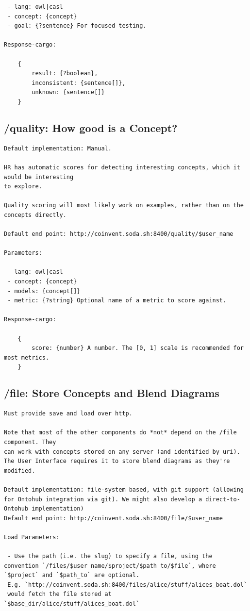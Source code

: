 \documentclass[10pt]{article}
\begin{document}
\begin{appendices}
\begin{verbatim}
 - lang: owl|casl
 - concept: {concept} 
 - goal: {?sentence} For focused testing.

Response-cargo: 
	
	{
		result: {?boolean},
		inconsistent: {sentence[]},
		unknown: {sentence[]}
	}

\end{verbatim}
\subsection{/quality: How good is a Concept?}
\begin{verbatim}
Default implementation: Manual.

HR has automatic scores for detecting interesting concepts, which it would be interesting
to explore.

Quality scoring will most likely work on examples, rather than on the concepts directly.
 
Default end point: http://coinvent.soda.sh:8400/quality/$user_name

Parameters:

 - lang: owl|casl
 - concept: {concept}
 - models: {concept[]} 
 - metric: {?string} Optional name of a metric to score against.

Response-cargo: 
	
	{
		score: {number} A number. The [0, 1] scale is recommended for most metrics.
	}
\end{verbatim}

\subsection{/file: Store Concepts and Blend Diagrams}
\begin{verbatim}
Must provide save and load over http.

Note that most of the other components do *not* depend on the /file component. They
can work with concepts stored on any server (and identified by uri). The User Interface requires it to store blend diagrams as they're modified.

Default implementation: file-system based, with git support (allowing for Ontohub integration via git). We might also develop a direct-to-Ontohub implementation)   
Default end point: http://coinvent.soda.sh:8400/file/$user_name

Load Parameters: 

 - Use the path (i.e. the slug) to specify a file, using the convention `/files/$user_name/$project/$path_to/$file`, where `$project` and `$path_to` are optional.
 E.g. `http://coinvent.soda.sh:8400/files/alice/stuff/alices_boat.dol`
 would fetch the file stored at `$base_dir/alice/stuff/alices_boat.dol`


\end{verbatim}
\end{appendices}
\end{document}
